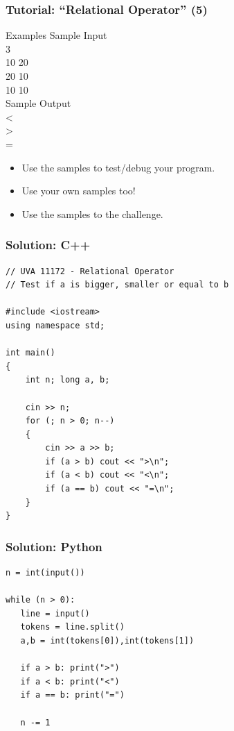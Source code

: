 \documentclass{beamer}
\begin{document}
\begin{frame}
  \frametitle{Tutorial: ``Relational Operator'' (5)}
  \begin{block}{Examples}
  \alert{Sample Input}\\
  3\\
  10 20\\
  20 10\\
  10 10\\
  \alert{Sample Output}\\
  <\\
  >\\
  =\\
  \end{block}

  \begin{itemize}
    \item Use the samples to test/debug your program.
    \item Use your own samples too!
    \item Use the samples to  the challenge.
  \end{itemize}
\end{frame}



\begin{frame}[fragile]
  \frametitle{Solution: C++}

\begin{block}{}
{\smaller
\begin{verbatim}
// UVA 11172 - Relational Operator
// Test if a is bigger, smaller or equal to b

#include <iostream>
using namespace std;

int main()
{
    int n; long a, b;

    cin >> n;
    for (; n > 0; n--)
    {
        cin >> a >> b;
        if (a > b) cout << ">\n";
        if (a < b) cout << "<\n";
        if (a == b) cout << "=\n";
    }
}
\end{verbatim}}
\end{block}
\end{frame}

\begin{frame}[fragile]
  \frametitle{Solution: Python}
  \begin{block}{}
\begin{verbatim}
n = int(input())

while (n > 0):
   line = input()
   tokens = line.split()
   a,b = int(tokens[0]),int(tokens[1])

   if a > b: print(">")
   if a < b: print("<")
   if a == b: print("=")

   n -= 1
\end{verbatim}
  \end{block}

\end{frame}
\end{document}
